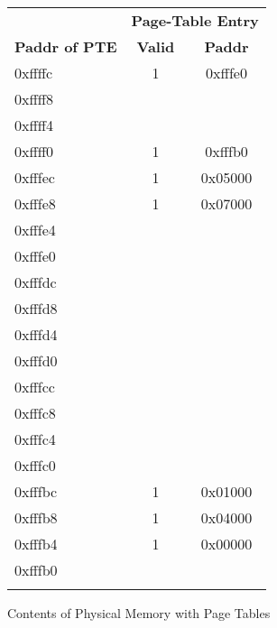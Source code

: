 \documentclass[10pt]{article}
\begin{document}
\begin{figure}[H]
\centering
{
\begin{tabular}{@{\extracolsep{3pt}}lcc@{}}
\Xhline{2\arrayrulewidth}
& \multicolumn{2}{c}{\textbf{Page-Table Entry}} \\
\cline{2-3}
\textbf{Paddr of PTE} & \textbf{Valid} & \textbf{Paddr}\\
\Xhline{2\arrayrulewidth}
0xffffc & 1 & 0xfffe0 \\
\hline
0xffff8 & &  \\
\hline
0xffff4 & &  \\
\hline
0xffff0 & 1 & 0xfffb0 \\
\Xhline{2\arrayrulewidth}
0xfffec & 1 & 0x05000 \\
\hline
0xfffe8 & 1 & 0x07000 \\
\hline
0xfffe4 & &  \\
\hline
0xfffe0 & & \\
\Xhline{2\arrayrulewidth}
0xfffdc & & \\
\hline
0xfffd8 & &  \\
\hline
0xfffd4 & &  \\
\hline
0xfffd0 & & \\
\Xhline{2\arrayrulewidth}
0xfffcc & & \\
\hline
0xfffc8 & &  \\
\hline
0xfffc4 & &  \\
\hline
0xfffc0 & & \\
\Xhline{2\arrayrulewidth}
0xfffbc & 1 & 0x01000\\
\hline
0xfffb8 & 1 & 0x04000\\
\hline
0xfffb4 & 1 & 0x00000 \\
\hline
0xfffb0 & & \\
\Xhline{2\arrayrulewidth}
\end{tabular}
}
\caption{Contents of Physical Memory with Page Tables}
\end{figure}
\end{document}
